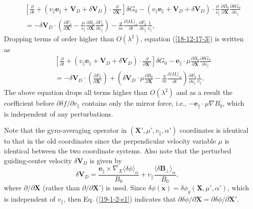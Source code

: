\documentclass{article}
\begin{document}
\begin{eqnarray}
  &  & \left[ \frac{\partial}{\partial t} + (v_{\parallel}
  \mathbf{e}_{\parallel} +\mathbf{V}_D + \delta \mathbf{V}_D) \cdot
  \frac{\partial}{\partial \mathbf{X}'} \right] \delta G_0 - (v_{\parallel}
  \mathbf{e}_{\parallel} +\mathbf{V}_D + \delta \mathbf{V}_D) \cdot
  \frac{\mu}{v_{\parallel}}  \frac{\partial B_0}{\partial \mathbf{X}}
  \frac{\partial \delta G_0}{\partial v_{\parallel}} \nonumber\\
  &  & = - \delta \mathbf{V}_D \cdot \left( \frac{\partial F_0}{\partial
  \mathbf{X}'} - \frac{\mu}{v_{\parallel}}  \frac{\partial B_0}{\partial
  \mathbf{X}} \frac{\partial F_0}{\partial v_{\parallel}} \right) -
  \frac{q}{m}  \frac{\partial \langle \delta L \rangle_{\alpha}}{\partial t} 
  \frac{\partial F_0}{\partial v_{\parallel}}  \frac{1}{v_{\parallel}}, 
  \label{18-12-17-3}
\end{eqnarray}
Dropping terms of order higher than $O (\lambda^2)$, equation
(\ref{18-12-17-3}) is written as
\begin{eqnarray}
  &  & \left[ \frac{\partial}{\partial t} + (v_{\parallel}
  \mathbf{e}_{\parallel} +\mathbf{V}_D + \delta \mathbf{V}_D) \cdot
  \frac{\partial}{\partial \mathbf{X}'} \right] \delta G_0
  -\mathbf{e}_{\parallel} \cdot \mu \frac{\partial B_0}{\partial \mathbf{X}}
  \frac{\partial \delta G_0}{\partial v_{\parallel}} \nonumber\\
  &  & = - \delta \mathbf{V}_D \cdot \left( \frac{\partial F_0}{\partial
  \mathbf{X}'} \right) + \left( \delta \mathbf{V}_D \cdot \mu \frac{\partial
  B_0}{\partial \mathbf{X}} - \frac{q}{m}  \frac{\partial \langle \delta L
  \rangle_{\alpha}}{\partial t} \right)  \frac{\partial F_0}{\partial
  v_{\parallel}}  \frac{1}{v_{\parallel}}, 
\end{eqnarray}
The above equation drops all terms higher than $O (\lambda^2)$ and as a result
the coefficient before $\partial \delta f / \partial v_{\parallel}$ contains
only the mirror force, i.e., $-\mathbf{e}_{\parallel} \cdot \mu \nabla B_0$,
which is independent of any perturbations.

Note that the gyro-averaging operator in $(\mathbf{X}', \mu', v_{\parallel},
\alpha')$ coordinates is identical to that in the old coordinates since the
perpendicular velocity variable $\mu$ is identical between the two coordinate
systems. Also note that the perturbed guiding-center velocity $\delta
\mathbf{V}_D$ is given by
\begin{equation}
  \delta \mathbf{V}_D = \frac{\mathbf{e}_{\parallel} \times \nabla_X \langle
  \delta \phi \rangle_{\alpha}}{B_0} + v_{\parallel} \frac{\langle \delta
  \mathbf{B}_{\perp} \rangle_{\alpha}}{B_0},
\end{equation}
where $\partial / \partial \mathbf{X}$ (rather than $\partial / \partial
\mathbf{X}'$) is used. Since $\delta \phi (\mathbf{x}) = \delta \phi_g
(\mathbf{X}, \mu', \alpha')$, which is independent of $v_{\parallel}$, then
Eq. (\ref{19-1-2-e1}) indicates that $\partial \delta \phi / \partial
\mathbf{X}= \partial \delta \phi / \partial \mathbf{X}'$.
\end{document}
